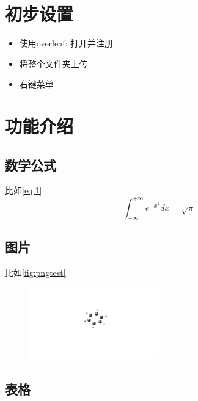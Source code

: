 \section{初步设置}

\begin{itemize}
    \item 使用overleaf: 打开并注册
    \item 将整个文件夹上传
    \item 右键菜单
\end{itemize}

\section{功能介绍}

\subsection{数学公式}

比如\eqref{eq:1}
\begin{equation}
    \label{eq:1}
    \int_{-\infty}^{+\infty} e^{-x^2} dx = \sqrt{\pi}
\end{equation}

\subsection{图片}

比如\autoref{fig:pngtest}
\begin{figure}[htbp]
    \centering
    \includegraphics[width=0.5\textwidth]{figures/pngtest}
    \label{fig:pngtest}
\end{figure}

\subsection{表格}

